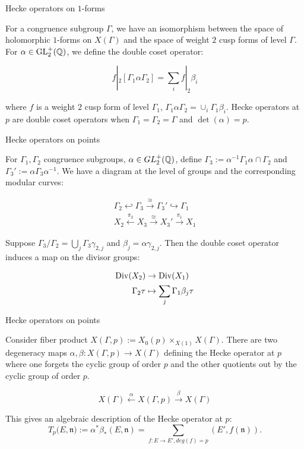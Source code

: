 \begin{frame}{Hecke operators on $1$-forms}

For a congruence subgroup $\Gamma$, we have an isomorphism between the space of holomorphic $1$-forms on $X(\Gamma)$ and the space of weight $2$ cusp forms of level $\Gamma$. For $\alpha \in \operatorname{GL}_2^+(\mathbb{Q})$, we define the double coset operator:

\[
f|_2 [\Gamma_1 \alpha \Gamma_2] = \sum_i f|_2 \beta_i
\]

where $f$ is a weight $2$ cusp form of level $\Gamma_1$, $\Gamma_1 \alpha \Gamma_2 = \cup_i \Gamma_1 \beta_i$. Hecke operators at $p$ are double coset operators when $\Gamma_1= \Gamma_2 = \Gamma$ and $\det(\alpha) = p$.

\end{frame}

\begin{frame}{Hecke operators on points}

For $\Gamma_1, \Gamma_2$ congruence subgroups, $\alpha \in GL_2^+(\mathbb{Q}) $, define $\Gamma_3 := \alpha^{-1} \Gamma_1 \alpha \cap \Gamma_2$ and $\Gamma_3' := \alpha \Gamma_3 \alpha^{-1}$. We have a diagram at the level of groups and the corresponding modular curves:

\begin{align*}
\Gamma_2 \hookleftarrow \Gamma_3 \xrightarrow{\cong} \Gamma_3' \hookrightarrow \Gamma_1 \\
X_2 \xleftarrow{\pi_2} X_3 \xrightarrow{\cong} X_3' \xrightarrow{\pi_1} X_1
\end{align*}

Suppose $\Gamma_3 / \Gamma_2 = \bigcup_j \Gamma_3 \gamma_{2,j}$ and $\beta_j = \alpha \gamma_{2,j}$. Then the double coset operator induces a map on the divisor groups:

\begin{align*}
    \operatorname{Div}(X_2) &\rightarrow \operatorname{Div}(X_1) \\
    \Gamma_2 \tau &\mapsto \sum_j \Gamma_1 \beta_j \tau
\end{align*}

\end{frame}

\begin{frame}{Hecke operators on points}

Consider fiber product $X(\Gamma, p) := X_0(p) \times_{X(1)} X(\Gamma)$. There are two degeneracy maps $\alpha,\beta: X(\Gamma,p) \rightarrow X(\Gamma)$ defining the Hecke operator at $p$ where one forgets the cyclic group of order $p$ and the other quotients out by the cyclic group of order $p$.

\[
X(\Gamma) \xleftarrow{\alpha} X(\Gamma,p) \xrightarrow{\beta} X(\Gamma)
\]

This gives an algebraic description of the Hecke operator at $p$:
\[
T_p(E,\mathfrak{n)} := \alpha^* \beta_* (E,\mathfrak{n}) = \sum_{f:E\rightarrow E', deg(f) = p} (E',f(\mathfrak{n})).
\]

\end{frame}


